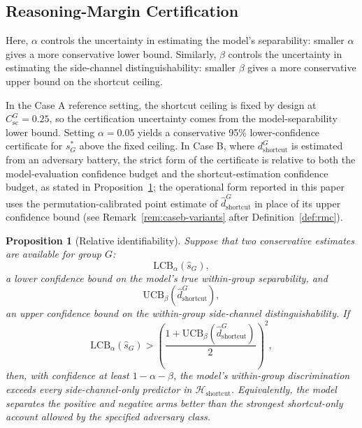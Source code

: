 \documentclass[conference]{IEEEtran}
\newtheorem{proposition}{Proposition}
\theoremstyle{remark}
\newcommand{\LCB}{\mathrm{LCB}}
\newcommand{\UCB}{\mathrm{UCB}}
\newcommand{\shat}{\hat{s}_G}
\newcommand{\shortcutDisc}{d_{\mathrm{shortcut}}^{G}}
\newcommand{\hatshortcutDisc}{\hat d_{\mathrm{shortcut}}^{G}}
\newcommand{\shortcutHypCls}{\mathcal{H}_{\mathrm{shortcut}}}
\newcommand{\shortcutCeiling}{C_{\mathrm{sc}}^{G}}
\begin{document}
\subsection{Reasoning-Margin Certification}
\label{sec:rmc}

Here, $\alpha$ controls the uncertainty in estimating the model's separability:
smaller $\alpha$ gives a more conservative lower bound.
Similarly, $\beta$ controls the uncertainty in estimating the side-channel
distinguishability: smaller $\beta$ gives a more conservative upper bound on
the shortcut ceiling.

In the Case A reference setting, the shortcut ceiling is fixed by design at
$\shortcutCeiling=0.25$, so the certification uncertainty comes from the
model-separability lower bound.  Setting $\alpha=0.05$ yields a conservative
95\% lower-confidence certificate for $s_G^*$ above the fixed ceiling.  In
Case B, where $\shortcutDisc$ is estimated from an adversary battery, the strict
form of the certificate is relative to both the model-evaluation confidence
budget and the shortcut-estimation confidence budget, as stated in
Proposition~\ref{prop:relid}; the operational form reported in this paper uses
the permutation-calibrated point estimate of $\hatshortcutDisc$ in place of its
upper confidence bound (see Remark~\ref{rem:caseb-variants} after
Definition~\ref{def:rmc}).

\begin{proposition}[Relative identifiability]
\label{prop:relid}
Suppose that two conservative estimates are available for group $G$:
\begin{equation}\label{eq:formula-40}
\LCB_{\alpha}(\shat),
\end{equation}
a lower confidence bound on the model's true within-group separability, and
\begin{equation}\label{eq:formula-41}
\UCB_{\beta}(\hatshortcutDisc),
\end{equation}
an upper confidence bound on the within-group side-channel distinguishability.
If
\begin{equation}\label{eq:formula-42}
\LCB_{\alpha}(\shat)
>
\left(\frac{1+\UCB_{\beta}(\hatshortcutDisc)}{2}\right)^2,
\end{equation}
then, with confidence at least $1-\alpha-\beta$, the model's within-group
discrimination exceeds every side-channel-only predictor in
$\shortcutHypCls$.
Equivalently, the model separates the positive and negative arms better than
the strongest shortcut-only account allowed by the specified adversary class.
\end{proposition}
\end{document}
